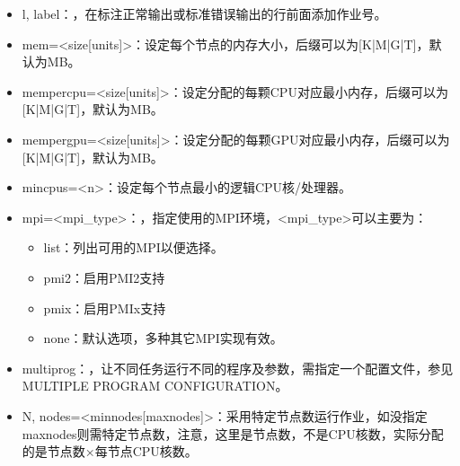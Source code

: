 \documentclass[a4paper,12pt,english]{sphinxmanual}
\begin{document}
\begin{itemize}
\item {} 
\sphinxAtStartPar
\sphinxhyphen{}l, \sphinxhyphen{}\sphinxhyphen{}label：，在标注正常输出或标准错误输出的行前面添加作业号。

\item {} 
\sphinxAtStartPar
\sphinxhyphen{}\sphinxhyphen{}mem=<size{[}units{]}>：设定每个节点的内存大小，后缀可以为{[}K|M|G|T{]}，默认为MB。

\item {} 
\sphinxAtStartPar
\sphinxhyphen{}\sphinxhyphen{}mem\sphinxhyphen{}per\sphinxhyphen{}cpu=<size{[}units{]}>：设定分配的每颗CPU对应最小内存，后缀可以为{[}K|M|G|T{]}，默认为MB。

\item {} 
\sphinxAtStartPar
\sphinxhyphen{}\sphinxhyphen{}mem\sphinxhyphen{}per\sphinxhyphen{}gpu=<size{[}units{]}>：设定分配的每颗GPU对应最小内存，后缀可以为{[}K|M|G|T{]}，默认为MB。

\item {} 
\sphinxAtStartPar
\sphinxhyphen{}\sphinxhyphen{}mincpus=<n>：设定每个节点最小的逻辑CPU核/处理器。

\item {} 
\sphinxAtStartPar
\sphinxhyphen{}\sphinxhyphen{}mpi=<mpi\_type>：，指定使用的MPI环境，<mpi\_type>可以主要为：
\begin{itemize}
\item {} 
\sphinxAtStartPar
list：列出可用的MPI以便选择。

\item {} 
\sphinxAtStartPar
pmi2：启用PMI2支持

\item {} 
\sphinxAtStartPar
pmix：启用PMIx支持

\item {} 
\sphinxAtStartPar
none：默认选项，多种其它MPI实现有效。

\end{itemize}

\item {} 
\sphinxAtStartPar
\sphinxhyphen{}\sphinxhyphen{}multi\sphinxhyphen{}prog：，让不同任务运行不同的程序及参数，需指定一个配置文件，参见MULTIPLE PROGRAM CONFIGURATION。

\item {} 
\sphinxAtStartPar
\sphinxhyphen{}N, \sphinxhyphen{}\sphinxhyphen{}nodes=<minnodes{[}\sphinxhyphen{}maxnodes{]}>：采用特定节点数运行作业，如没指定maxnodes则需特定节点数，注意，这里是节点数，不是CPU核数，实际分配的是节点数×每节点CPU核数。


\end{itemize}
\end{document}
